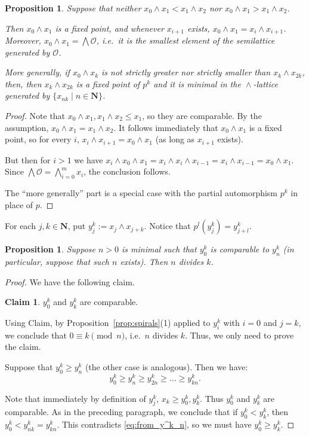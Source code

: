 \documentclass[final,a4paper,12pt,reqno]{amsart}
\newcommand{\bN}{{\mathbf{N}}}
\newcommand{\meet}{\mathop{\wedge}}
\newcommand{\bigmeet}{\bigwedge}
\newtheorem{prop}[thm]{Proposition}
\theoremstyle{remark}
\theoremstyle{definition}
\newtheorem*{clm*}{Claim}
\newenvironment{clmproof}[1][\proofname]{\proof[#1]\renewcommand{\qedsymbol}{$\square$(claim)}}{\endproof}
\let \leq \leqslant
\let \geq \geqslant
\begin{document}
	
	\begin{prop}
		\label{prop:meet_of_two}
		Suppose that neither $x_0\meet x_1<x_1\meet x_2$ nor $x_0\meet x_1>x_1\meet x_2$.
		
		Then $x_0\meet x_1$ is a fixed point, and whenever $x_{i+1}$ exists, $x_0\meet x_1=x_i\meet x_{i+1}$. Moreover, $x_0\meet x_1=\bigmeet \mathcal O$, i.e.\ it is the smallest element of the semilattice generated by $\mathcal O$.
		
		More generally, if $x_0\meet x_k$ is not strictly greater nor strictly smaller than $x_k\meet x_{2k}$, then, then $x_k\meet x_{2k}$ is a fixed point of $p^k$ and it is minimal in the $\meet$-lattice generated by $\{x_{nk}\mid n\in \bN \}$.
	\end{prop}
	\begin{proof}
		Note that $x_0\meet x_1,x_1\meet x_2\leq x_1$, so they are comparable. By the assumption, $x_0\meet x_1=x_1\meet x_2$. It follows immediately that $x_0\meet x_1$ is a fixed point, so for every $i$, $x_i\meet x_{i+1}=x_0\meet x_1$ (as long as $x_{i+1}$ exists).
		
		But then for $i>1$ we have $x_i\meet x_0\meet x_1=x_i\meet x_i\meet x_{i-1}=x_i\meet x_{i-1}=x_0\meet x_1$. Since $\bigwedge \mathcal O=\bigwedge_{i=0}^m x_i$, the conclusion follows.
		
		The ``more generally'' part is a special case with the partial automorphism $p^k$ in place of $p$.
	\end{proof}
	
	For each $j,k\in \bN$, put $y^k_j:=x_j\meet x_{j+k}$. Notice that $p^l(y^k_j)=y^k_{j+l}$.
	\begin{prop}
		\label{prop:minimal_n_divides_k}
		Suppose $n>0$ is minimal such that $y^k_0$ is comparable to $y^k_{n}$ (in particular, suppose that such $n$ exists). Then $n$ divides $k$.
	\end{prop}
	\begin{proof}
		We have the following claim.
		
		\begin{clm*}
			$y^k_0$ and $y^k_k$ are comparable.
		\end{clm*}
		
		Using Claim, by Proposition~\ref{prop:spirals}(1) applied to $y^k_i$ with $i=0$ and $j=k$, we conclude that $0\equiv k\pmod n$, i.e.\ $n$ divides $k$. Thus, we only need to prove the claim.
		
		\begin{clmproof}[Proof of claim]
			Suppose that $y^k_0\geq y^k_n$ (the other case is analogous). Then  we have:
			\begin{equation}
			\label{eq:from_y^k_n}
			y^k_0\geq y^k_n\geq y^k_{2n}\geq \ldots \geq y^k_{kn}.
			\end{equation}
			
			Note that immediately by definition of $y^k_j$, $x_k\geq y^k_0,y^k_k$. Thus $y^k_0$ and $y^k_k$ are comparable. As in the preceding paragraph, we conclude that if $y^k_0<y^k_k$, then $y^k_0<y^k_{nk}=y^k_{kn}$. This contradicts \eqref{eq:from_y^k_n}, so we must have $y^k_0\geq y^k_k$.
		\end{clmproof}
	\end{proof}
	
\end{document}
